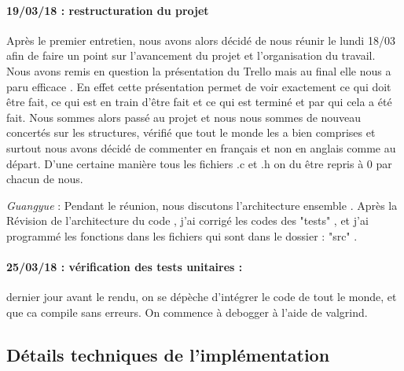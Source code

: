 \documentclass[10pt]{article}
\begin{document}
					\paragraph{19/03/18 : restructuration du projet}\label{19_03_18}
					Après le premier entretien, nous avons alors décidé de nous réunir le lundi 18/03
					afin de faire un point sur l’avancement du projet et l’organisation du travail.
					Nous avons remis en question la présentation du Trello mais au final elle nous a paru efficace .
					En effet cette présentation permet de voir exactement ce qui doit être fait, ce qui est
					en train d’être fait et ce qui est terminé et par qui cela a été fait. 
					Nous sommes alors passé au projet et nous nous sommes de nouveau concertés sur les structures,
					vérifié que tout le monde les a bien comprises et surtout nous avons décidé de commenter en
					français et non en anglais comme au départ. D’une certaine manière tous les fichiers .c et .h on
					du être repris à 0 par chacun de nous.
					
					\textit{Guangyue} : Pendant le réunion, nous discutons l'architecture ensemble .
					Après la Révision de l'architecture du code , j'ai corrigé les codes des "tests" ,
					et j'ai programmé les fonctions dans les fichiers qui sont dans  le dossier : "src" .

					
				\paragraph{25/03/18 : vérification des tests unitaires :}
					dernier jour avant le rendu, on se dépèche d'intégrer le code de tout le monde,
					et que ca compile sans erreurs. On commence à debogger à l'aide de valgrind.
		\newpage
		\subsection{Détails techniques de l'implémentation}
\end{document}

